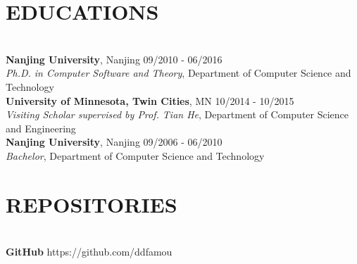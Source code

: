 \documentclass{res}
\begin{document}
\begin{resume}
\section{{EDUCATIONS}}
\vspace{-10pt}
\hrulefill\\
{\bf Nanjing University}, Nanjing \hfill  09/2010 - 06/2016 \\
{\sl Ph.D. in Computer Software and Theory}, Department of Computer Science and Technology\\
{\bf University of Minnesota, Twin Cities}, MN \hfill 10/2014 - 10/2015 \\
{\sl Visiting Scholar supervised by Prof. Tian He}, Department of Computer Science and Engineering\\
{\bf Nanjing University}, Nanjing  \hfill 09/2006 - 06/2010 \\
{\sl Bachelor}, Department of  Computer Science and Technology\\

\vspace{-20pt}
\section{{REPOSITORIES}}
\vspace{-10pt}
\hrulefill\\
{\bf GitHub} \hfill https://github.com/ddfamou

\end{resume}
\end{document}
